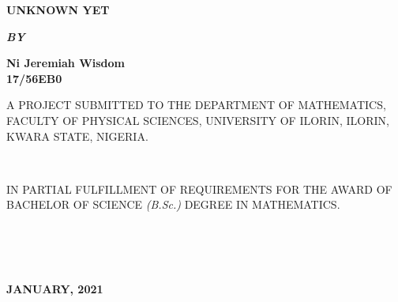 \documentclass[12pt]{report}
\newcommand{\bt}[1]{\textbf{#1}}
\begin{document}
	
	\clearpage
	\thispagestyle{empty}
	\begin{center}
		\LARGE \bt{UNKNOWN YET}
	\end{center}

	\hspace{7cm}
	
	\begin{center}
		\textbf{\textit{BY}}
	\end{center}
	
	\hspace{5cm}
	
	\begin{center}
		\Large \textbf{Ni Jeremiah Wisdom 
			\\
			17/56EB0}
	\end{center}
	
	\hspace{9cm}
	
	\begin{center}
		A PROJECT SUBMITTED TO THE DEPARTMENT OF MATHEMATICS, FACULTY OF PHYSICAL SCIENCES, UNIVERSITY OF ILORIN, ILORIN, KWARA STATE, NIGERIA.
	\end{center}

	\hspace{8cm} \\
	
	\begin{center}
		IN PARTIAL FULFILLMENT OF REQUIREMENTS FOR THE AWARD OF BACHELOR OF SCIENCE \textit{(B.Sc.)} DEGREE IN MATHEMATICS.
	\end{center}
	\hspace{5cm}
	\\ \\ \\
	\begin{center}
		\textbf{JANUARY, 2021}
	\end{center}

	\newpage
\end{document}
